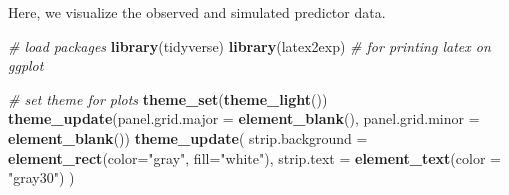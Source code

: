 \documentclass[12pt, twoside]{amherstthesis}
\newenvironment{Shaded}{\begin{snugshade}}{\end{snugshade}}
\newcommand{\AttributeTok}[1]{\textcolor[rgb]{0.13,0.29,0.53}{#1}}
\newcommand{\CommentTok}[1]{\textcolor[rgb]{0.56,0.35,0.01}{\textit{#1}}}
\newcommand{\FunctionTok}[1]{\textcolor[rgb]{0.13,0.29,0.53}{\textbf{#1}}}
\newcommand{\NormalTok}[1]{#1}
\newcommand{\StringTok}[1]{\textcolor[rgb]{0.31,0.60,0.02}{#1}}
\begin{document}
Here, we visualize the observed and simulated predictor data.

\scriptsize
\begin{Shaded}
\begin{Highlighting}[]
\CommentTok{\# load packages}
\FunctionTok{library}\NormalTok{(tidyverse)}
\FunctionTok{library}\NormalTok{(latex2exp) }\CommentTok{\# for printing latex on ggplot}

\CommentTok{\# set theme for plots}
\FunctionTok{theme\_set}\NormalTok{(}\FunctionTok{theme\_light}\NormalTok{())}
\FunctionTok{theme\_update}\NormalTok{(}\AttributeTok{panel.grid.major =} \FunctionTok{element\_blank}\NormalTok{(), }\AttributeTok{panel.grid.minor =} \FunctionTok{element\_blank}\NormalTok{())}
\FunctionTok{theme\_update}\NormalTok{(}
  \AttributeTok{strip.background =} \FunctionTok{element\_rect}\NormalTok{(}\AttributeTok{color=}\StringTok{"gray"}\NormalTok{, }\AttributeTok{fill=}\StringTok{"white"}\NormalTok{), }
  \AttributeTok{strip.text =} \FunctionTok{element\_text}\NormalTok{(}\AttributeTok{color =} \StringTok{"gray30"}\NormalTok{)}
\NormalTok{)}
\end{Highlighting}
\end{Shaded}
\normalsize
\end{document}
